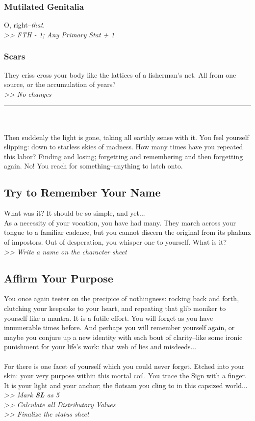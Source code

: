 \begin{multicols}{2}
\subsubsection*{Mutilated Genitalia}
O, right--\emph{that}.\\
\emph{>> FTH - 1; Any Primary Stat + 1}

\subsubsection*{Scars}
They criss cross your body like the lattices of a fisherman’s net. All from one source, or the accumulation of years?\\
\emph{>> No changes}\\
\end{multicols}
\hrule
\ \\
\ \\
Then suddenly the light is gone, taking all earthly sense with it. You feel yourself slipping: down to starless skies of madness. How many times have you repeated this labor? Finding and losing; forgetting and remembering and then forgetting again. No! You reach for something--anything to latch onto.

\vfill

\subsection*{Try to Remember Your Name}
What was it? It should be so simple, and yet...\\

As a necessity of your vocation, you have had many. They march across your tongue to a familiar cadence, but you cannot discern the original from its phalanx of impostors. Out of desperation, you whisper one to yourself. What is it?\\
\emph{>> Write a name on the character sheet}\\

\pagebreak

\subsection*{Affirm Your Purpose}
You once again teeter on the precipice of nothingness: rocking back and forth, clutching your keepsake to your heart, and repeating that glib moniker to yourself like a mantra. It is a futile effort. You will forget as you have innumerable times before. And perhaps you will remember yourself again, or maybe you conjure up a new identity with each bout of clarity--like some ironic punishment for your life’s work: that web of lies and misdeeds...\\
\ \\
For there is one facet of yourself which you could never forget. Etched into your skin: your very purpose within this mortal coil. You trace the Sign with a finger. It is your light and your anchor; the flotsam you cling to in this capsized world...\\
\emph{>> Mark \textbf{SL} as 5\\
>> Calculate all Distributory Values\\
>> Finalize the status sheet}

